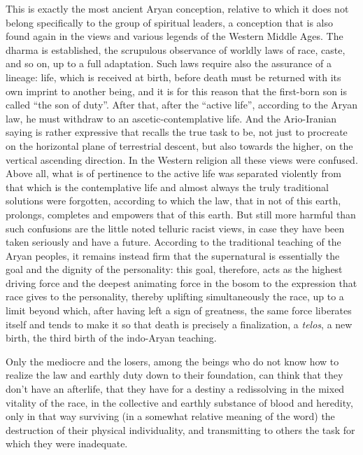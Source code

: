 This is exactly the most ancient Aryan conception, relative to which it does not belong specifically to the group of spiritual leaders, a conception that is also found again in the views and various legends of the Western Middle Ages. The dharma is established, the scrupulous observance of worldly laws of race, caste, and so on, up to a full adaptation. Such laws require also the assurance of a lineage: life, which is received at birth, before death must be returned with its own imprint to another being, and it is for this reason that the first-born son is called ``the son of duty''. After that, after the ``active life'', according to the Aryan law, he must withdraw to an ascetic-contemplative life. And the Ario-Iranian saying is rather expressive that recalls the true task to be, not just to procreate on the horizontal plane of terrestrial descent, but also towards the higher, on the vertical ascending direction. In the Western religion all these views were confused. Above all, what is of pertinence to the active life was separated violently from that which is the contemplative life and almost always the truly traditional solutions were forgotten, according to which the law, that in not of this earth, prolongs, completes and empowers that of this earth. But still more harmful than such confusions are the little noted telluric racist views, in case they have been taken seriously and have a future. According to the traditional teaching of the Aryan peoples, it remains instead firm that the supernatural is essentially the goal and the dignity of the personality: this goal, therefore, acts as the highest driving force and the deepest animating force in the bosom to the expression that race gives to the personality, thereby uplifting simultaneously the race, up to a limit beyond which, after having left a sign of greatness, the same force liberates itself and tends to make it so that death is precisely a finalization, a \emph{telos}, a new birth, the third birth of the indo-Aryan teaching.

Only the mediocre and the losers, among the beings who do not know how to realize the law and earthly duty down to their foundation, can think that they don't have an afterlife, that they have for a destiny a redissolving in the mixed vitality of the race, in the collective and earthly substance of blood and heredity, only in that way surviving (in a somewhat relative meaning of the word) the destruction of their physical individuality, and transmitting to others the task for which they were inadequate.


